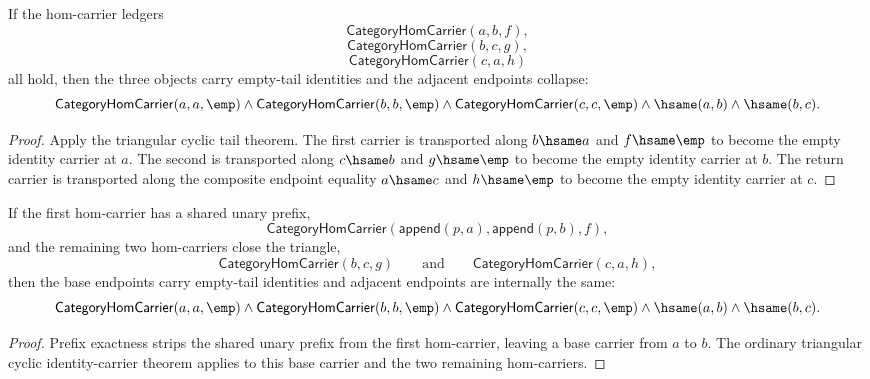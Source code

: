 \begin{theorem}
\label{thm:category-hom-carrier-triangle-cycle-identity-carriers}
If the hom-carrier ledgers
$$
\mathsf{CategoryHomCarrier}(a,b,f),
$$
$$
\mathsf{CategoryHomCarrier}(b,c,g),
$$
$$
\mathsf{CategoryHomCarrier}(c,a,h)
$$
all hold, then the three objects carry empty-tail identities and the adjacent
endpoints collapse:
$$
\mathsf{CategoryHomCarrier}(a,a,\emp)\land
\mathsf{CategoryHomCarrier}(b,b,\emp)\land
\mathsf{CategoryHomCarrier}(c,c,\emp)\land
\hsame(a,b)\land
\hsame(b,c).
$$
\end{theorem}
\begin{proof}
Apply the triangular cyclic tail theorem. The first carrier is transported
along $b\hsame a$ and $f\hsame\emp$ to become the empty identity carrier at
$a$. The second is transported along $c\hsame b$ and $g\hsame\emp$ to become
the empty identity carrier at $b$. The return carrier is transported along the
composite endpoint equality $a\hsame c$ and $h\hsame\emp$ to become the empty
identity carrier at $c$.
\end{proof}

\begin{theorem}
\label{thm:category-hom-carrier-unary-prefix-triangle-cycle-identity-carriers}
If the first hom-carrier has a shared unary prefix,
$$
\mathsf{CategoryHomCarrier}(\mathsf{append}(p,a),\mathsf{append}(p,b),f),
$$
and the remaining two hom-carriers close the triangle,
$$
\mathsf{CategoryHomCarrier}(b,c,g)\qquad\text{and}\qquad
\mathsf{CategoryHomCarrier}(c,a,h),
$$
then the base endpoints carry empty-tail identities and adjacent endpoints are
internally the same:
$$
\mathsf{CategoryHomCarrier}(a,a,\emp)\land
\mathsf{CategoryHomCarrier}(b,b,\emp)\land
\mathsf{CategoryHomCarrier}(c,c,\emp)\land
\hsame(a,b)\land\hsame(b,c).
$$
\end{theorem}
\begin{proof}
Prefix exactness strips the shared unary prefix from the first hom-carrier,
leaving a base carrier from $a$ to $b$. The ordinary triangular cyclic
identity-carrier theorem applies to this base carrier and the two remaining
hom-carriers.
\end{proof}

